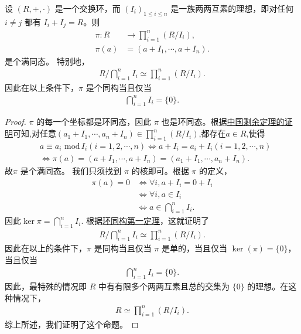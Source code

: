 \documentclass[../../main.tex]{subfiles}
\begin{document}
\begin{proposition}[中国剩余定理推论]\label{proposition:中国剩余定理推论}
设 $(R, +, \cdot)$ 是一个交换环，而 $(I_i)_{1 \leqslant i \leqslant n}$ 是一族两两互素的理想，即对任何 $i \neq j$ 都有 $I_i + I_j = R$。则
\begin{align*}
\pi: R &\to \prod_{i = 1}^n (R / I_i) ,\\
\pi(a) &= (a + I_1, \cdots, a + I_n) .
\end{align*}
是个满同态。
特别地，
\begin{align*}
R \big/ \bigcap_{i = 1}^n I_i \simeq \prod_{i = 1}^n (R / I_i) .
\end{align*}
因此在以上条件下，$\pi$ 是个同构当且仅当
\begin{align*}
\bigcap_{i = 1}^n I_i = \{0\} .
\end{align*}
\end{proposition}
\begin{proof}
$\pi$ 的每一个坐标都是环同态，因此 $\pi$ 也是环同态。根据\hyperref[theorem:中国剩余定理]{中国剩余定理的证明}可知,对任意$(a_1+I_1,\cdots,a_n+I_n)\in \prod_{i = 1}^n (R / I_i)$,都存在$a\in R$,使得
\begin{align*}
&a\equiv a_i\,\,\mathrm{mod}\,I_i\left( i=1,2,\cdots ,n \right) \Longleftrightarrow a+I_i=a_i+I_i\left( i=1,2,\cdots ,n \right) 
\\
&\Longleftrightarrow \pi \left( a \right) =\left( a+I_1,\cdots ,a+I_n \right) =\left( a_1+I_1,\cdots ,a_n+I_n \right)  .
\end{align*}
故$\pi$ 是个满同态。
我们只须找到 $\pi$ 的核即可。根据 $\pi$ 的定义，
\begin{align*}
\pi(a) = 0 &\iff \forall i, a + I_i = 0 + I_i \\
&\iff \forall i, a \in I_i \\
&\iff a \in \bigcap_{i = 1}^n I_i .
\end{align*}
因此$\ker \pi=\bigcap_{i = 1}^n I_i.$
根据\hyperref[theorem:环同构第一定理]{环同构第一定理}，这就证明了
\begin{align*}
R \big/ \bigcap_{i = 1}^n I_i \simeq \prod_{i = 1}^n (R / I_i).
\end{align*}
因此在以上的条件下，$\pi$ 是同构当且仅当 $\pi$ 是单的，当且仅当 $\ker(\pi) = \{0\}$，当且仅当
\begin{align*}
\bigcap_{i = 1}^n I_i = \{0\} .
\end{align*}
因此，最特殊的情况即 $R$ 中有有限多个两两互素且总的交集为 $\{0\}$ 的理想。在这种情况下，
\begin{align*}
R \simeq \prod_{i = 1}^n (R / I_i).
\end{align*}
综上所述，我们证明了这个命题。 
\end{proof}
\end{document}

